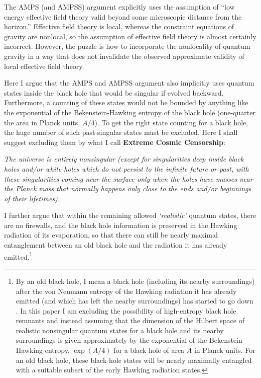 \documentclass[12pt]{article}
\begin{document}
The AMPS (and AMPSS) argument explicitly uses the assumption of ``low energy effective field theory valid beyond some microscopic distance from the horizon.''  Effective field theory is local, whereas the constraint equations of gravity are nonlocal, so the assumption of effective field theory is almost certainly incorrect.  However, the puzzle is how to incorporate the nonlocality of quantum gravity in a way that does not invalidate the observed approximate validity of local effective field theory.

Here I argue that the AMPS and AMPSS argument also implicitly uses quantum states inside the black hole that would be singular if evolved backward.  Furthermore, a counting of these states would not be bounded by anything like the exponential of the Bekenstein-Hawking entropy of the black hole (one-quarter the area in Planck units, $A/4$).  To get the right state counting for a black hole, the huge number of such past-singular states must be excluded.  Here I shall suggest excluding them by what I call {\bf Extreme Cosmic Censorship}:

{\it The universe is entirely nonsingular (except for singularities deep inside black holes and/or white holes which do not persist to the infinite future or past, with these singularities coming near the surface only when the holes have masses near the Planck mass that normally happens only close to the ends and/or beginnings of their lifetimes).}

I further argue that within the remaining allowed {\it `realistic'} quantum states, there are no firewalls, and the black hole information is preserved in the Hawking radiation of its evaporation, so that there can still be nearly maximal entanglement between an old black hole and the radiation it has already emitted.\footnote{By an old black hole, I mean a black hole (including its nearby surroundings) after the von Neumann entropy of the Hawking radiation it has already emitted (and which has left the nearby surroundings) has started to go down \cite{Page:2013dx}.  In this paper I am excluding the possibility of high-entropy black hole remnants and instead assuming that the dimension of the Hilbert space of realistic nonsingular quantum states for a black hole and its nearby surroundings is given approximately by the exponential of the Bekenstein-Hawking entropy, $\exp{(A/4)}$ for a black hole of area $A$ in Planck units.  For an old black hole, these black hole states will be nearly maximally entangled with a suitable subset of the early Hawking radiation states.}
\end{document}
